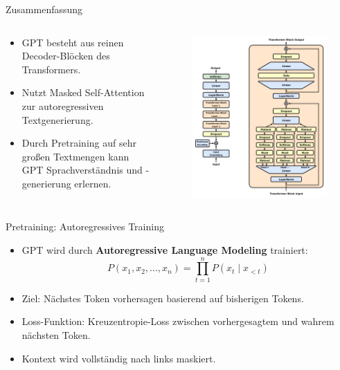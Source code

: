 \documentclass[aspectratio=1610, xcolor=dvipsnames, 9pt]{beamer}
\begin{document}
\begin{frame}{Zusammenfassung}
  \begin{columns}
    \begin{column}{0.5\textwidth}
      \begin{itemize}
        \item GPT besteht aus reinen Decoder-Blöcken des Transformers.
        \item Nutzt Masked Self-Attention zur autoregressiven Textgenerierung.
        \item Durch Pretraining auf sehr großen Textmengen kann GPT Sprachverständnis und -generierung erlernen.
      \end{itemize}
    \end{column}
    \begin{column}{0.5\textwidth}
      \begin{figure}
        \centering
        \includegraphics[width=0.8\columnwidth]{images/Full_GPT_architecture.png}
      \end{figure}
    \end{column}
  \end{columns}
\end{frame}

\begin{frame}{Pretraining: Autoregressives Training}
  \begin{itemize}
      \item GPT wird durch \textbf{Autoregressive Language Modeling} trainiert:
      \[
      P(x_1, x_2, ..., x_n) = \prod_{t=1}^{n} P(x_t \mid x_{<t})
      \]
      \item Ziel: Nächstes Token vorhersagen basierend auf bisherigen Tokens.
      \item Loss-Funktion: Kreuzentropie-Loss zwischen vorhergesagtem und wahrem nächsten Token.
      \item Kontext wird vollständig nach links maskiert.
  \end{itemize}
\end{frame}
\end{document}
